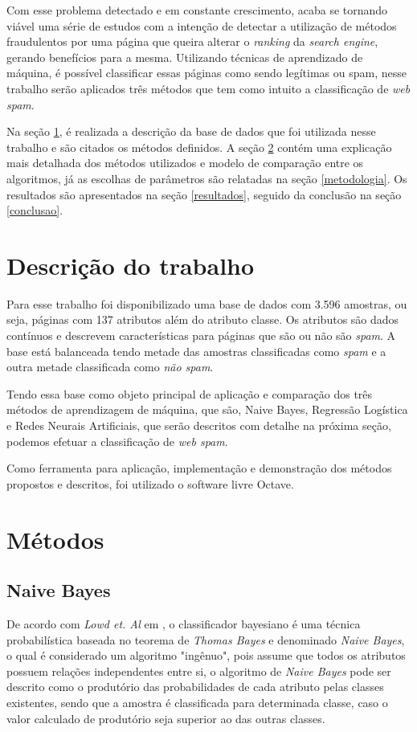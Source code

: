 \documentclass[10pt, conference, compsocconf]{IEEEtran}
\begin{document}
Com esse problema detectado e em constante crescimento, acaba se tornando viável uma série de  estudos com a intenção de detectar a utilização de métodos fraudulentos por uma página que queira alterar o \textit{ranking} da \textit{search engine}, gerando benefícios para a mesma. Utilizando técnicas de aprendizado de máquina, é possível classificar essas páginas como sendo legítimas ou spam, nesse trabalho serão aplicados três métodos que tem como intuito a classificação de \textit{web spam}.

Na seção \ref{descricao}, é realizada a descrição da base de dados que foi utilizada nesse trabalho e são citados os métodos definidos. A seção \ref{metodos} contém uma explicação mais detalhada dos métodos utilizados e modelo de comparação entre os algoritmos, já as escolhas de parâmetros são relatadas na seção \ref{metodologia}. Os resultados são apresentados na seção \ref{resultados}, seguido da conclusão na seção \ref{conclusao}.

\section{Descrição do trabalho}\label{descricao} 
Para esse trabalho foi disponibilizado uma base de dados com 3.596 amostras, ou seja, páginas com 137 atributos além do atributo classe. Os atributos são dados contínuos e descrevem características para páginas que são ou não são \textit{spam}. A base está balanceada tendo metade das amostras classificadas como \textit{spam} e a outra metade classificada como \textit{não spam}.

Tendo essa base como objeto principal de aplicação e comparação dos três métodos de aprendizagem de máquina, que são, Naive Bayes, Regressão Logística e Redes Neurais Artificiais, que serão descritos com detalhe na próxima seção, podemos efetuar a classificação de \textit{web spam}.

Como ferramenta para aplicação, implementação e demonstração dos métodos propostos e descritos, foi utilizado o software livre Octave.

\section{Métodos}\label{metodos}
\subsection{Naive Bayes}
De acordo com \textit{Lowd et. Al} em \cite{4}, o classificador bayesiano é uma técnica probabilística baseada no teorema de \textit{Thomas Bayes} e denominado \textit{Naive Bayes}, o qual é considerado um algoritmo "ingênuo", pois assume que todos os atributos possuem relações independentes entre si, o algoritmo de \textit{Naive Bayes} pode ser descrito como o produtório das probabilidades de cada atributo pelas classes existentes, sendo que a amostra é classificada para determinada classe, caso o valor calculado de produtório seja superior ao das outras classes. 
\end{document}
